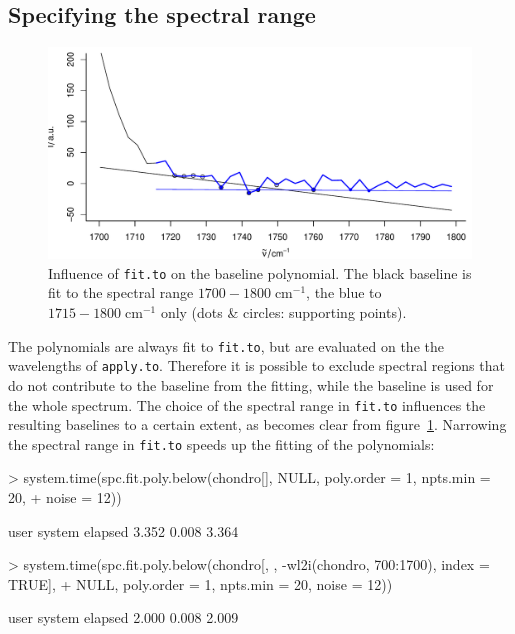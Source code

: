 \documentclass[a4paper, 10pt, smallheadings, DIV15]{scrartcl}
\newcommand{\rcm}[1]{\ensuremath{#1\;\mathrm{cm^{-1}}}\xspace}
\newcommand{\code}[1]{\nohyphens{\texttt{#1}}\xspace}
\begin{document}
\subsection*{Specifying the spectral range}
\begin{figure}[b]
\begin{center}
\includegraphics[width = .5\textwidth]{baselinebelow-figspcrange}
\caption{Influence of \code{fit.to} on the baseline polynomial. The black baseline is fit to the spectral range \rcm{1700 - 1800}, 
the blue to \rcm{1715 - 1800} only (dots \& circles: supporting points).}
\label{fig:spectralrange}
\end{center}
\end{figure}

The polynomials are always fit to \code{fit.to}, but are evaluated on the the wavelengths of \code{apply.to}. 
Therefore it is possible to exclude spectral regions that do not contribute to
the baseline from the fitting, while the baseline is used for the whole
spectrum.  
The choice of the spectral range in \code{fit.to} influences the resulting baselines to a certain extent, as becomes clear 
from figure~\ref{fig:spectralrange}.
Narrowing the spectral range in \code{fit.to} speeds up the fitting of the
polynomials:
\begin{Schunk}
\begin{Sinput}
> system.time(spc.fit.poly.below(chondro[], NULL, poly.order = 1, npts.min = 20, 
+     noise = 12))
\end{Sinput}
\begin{Soutput}
   user  system elapsed 
  3.352   0.008   3.364 
\end{Soutput}
\begin{Sinput}
> system.time(spc.fit.poly.below(chondro[, , -wl2i(chondro, 700:1700), index = TRUE], 
+     NULL, poly.order = 1, npts.min = 20, noise = 12))
\end{Sinput}
\begin{Soutput}
   user  system elapsed 
  2.000   0.008   2.009 
\end{Soutput}
\end{Schunk}
\end{document}
